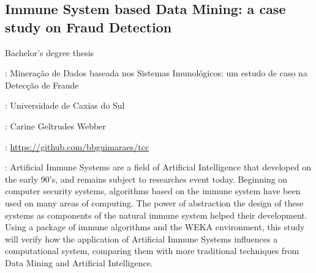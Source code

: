 \subsection*{Immune System based Data Mining: a case study on Fraud Detection}

Bachelor's degree thesis

\begin{description}[noitemsep]
    \item[Original title]:
        Mineração de Dados baseada nos Sistemas Imunológicos: um estudo de caso
        na Detecção de Fraude
    \item[Institution]: Universidade de Caxias do Sul
    \item[Advisor]: Carine Geltrudes Webber
    \item[Website]: \url{https://github.com/bbguimaraes/tcc}
    \item[Abstract]:
        Artificial Immune Systems are a field of Artificial Intelligence that
        developed on the early 90's, and remains subject to researches event
        today.  Beginning on computer security systems, algorithms based on the
        immune system have been used on many areas of computing. The power of
        abstraction the design of these systems as components of the natural
        immune system helped their development. Using a package of immune
        algorithms and the WEKA environment, this study will verify how the
        application of Artificial Immune Systems influences a computational
        system, comparing them with more traditional techniques from Data
        Mining and Artificial Intelligence.
\end{description}
